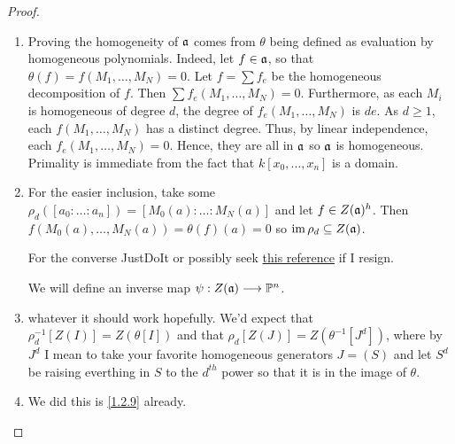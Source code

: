 \begin{proof}
    \begin{enumerate}[label = (\alph*)]
        \item Proving the homogeneity of $\mathfrak a$ comes from $\theta$ being defined as evaluation by homogeneous polynomials. Indeed, let $f \in \mathfrak a$, so that $\theta(f) = f(M_1, \dots, M_N) = 0$. Let $f = \sum f_e$ be the homogeneous decomposition of $f$. Then $\sum f_e(M_1, \dots, M_N) = 0$. Furthermore, as each $M_i$ is homogeneous of degree $d$, the degree of $f_e(M_1, \dots, M_N)$ is $de$. As $d \geq 1$, each $f(M_1, \dots, M_N)$ has a distinct degree. Thus, by linear independence, each $f_e(M_1, \dots, M_N) = 0$. Hence, they are all in $\mathfrak a$ so $\mathfrak a$ is homogeneous. Primality is immediate from the fact that $k[x_0, \dots, x_n]$ is a domain.

        \item For the easier inclusion, take some $\rho_d([a_0 : \dots : a_n]) = [M_0(a) : \dots : M_N(a)]$ and let $f \in Z(\mathfrak a)^h$. Then $f(M_0(a), \dots, M_N(a)) = \theta(f)(a) = 0$ so $\operatorname{im} \rho_d \subseteq Z(\mathfrak a)$. 

        For the converse JustDoIt or possibly seek \href{https://www.mathreference.com/ag-pv,duple.html}{this reference} if I resign.

        We will define an inverse map $\psi: Z(\mathfrak a) \longrightarrow \mathbb P^n$. 

        \item whatever it should work hopefully. We'd expect that $\rho_d^{-1}[Z(I)] = Z(\theta[I])$ and that $\rho_d[Z(J)] = Z(\theta^{-1}[J^d])$, where by $J^d$ I mean to take your favorite homogeneous generators $J = (S)$ and let $S^d$ be raising everthing in $S$ to the $d^{th}$ power so that it is in the image of $\theta$.

        \item We did this is \ref{1.2.9} already.
    \end{enumerate}
\end{proof}
